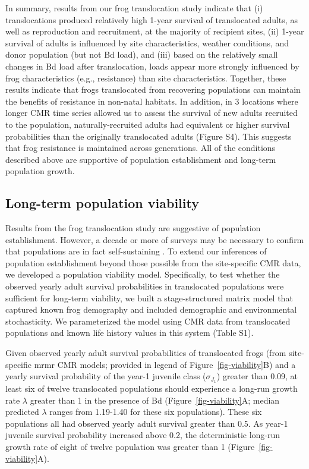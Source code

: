 \documentclass[9pt,twocolumn,twoside,lineno]{pnas-new}
\begin{document}
In summary, results from our frog translocation study indicate that (i)
translocations produced relatively high 1-year survival of translocated
adults, as well as reproduction and recruitment, at the majority of
recipient sites, (ii) 1-year survival of adults is influenced by site
characteristics, weather conditions, and donor population (but not Bd
load), and (iii) based on the relatively small changes in Bd load after
translocation, loads appear more strongly influenced by frog
characteristics (e.g., resistance) than site characteristics. Together,
these results indicate that frogs translocated from recovering
populations can maintain the benefits of resistance in non-natal
habitats. In addition, in 3 locations where longer CMR time series
allowed us to assess the survival of new adults recruited to the
population, naturally-recruited adults had equivalent or higher survival
probabilities than the originally translocated adults
(Figure S4). This suggests that frog
resistance is maintained across generations. All of the conditions
described above are supportive of population establishment and long-term
population growth.

\subsection*{Long-term population viability}

Results from the frog translocation study are suggestive of population
establishment. However, a decade or more of surveys may be necessary to
confirm that populations are in fact self-sustaining \citep{joseph2018}.
To extend our inferences of population establishment beyond those
possible from the site-specific CMR data, we developed a population
viability model. Specifically, to test whether the observed yearly adult
survival probabilities in translocated populations were sufficient for
long-term viability, we built a stage-structured matrix model that
captured known frog demography and included demographic and
environmental stochasticity. We parameterized the model using CMR data
from translocated populations and known life history values in this
system (Table S1).

Given observed yearly adult survival probabilities of translocated frogs
(from site-specific mrmr CMR models; provided in legend of
Figure~\ref{fig-viability}B) and a yearly survival probability of the
year-1 juvenile class (\(\sigma_{J_1}\)) greater than 0.09, at least six
of twelve translocated populations should experience a long-run growth
rate \(\lambda\) greater than 1 in the presence of Bd
(Figure~\ref{fig-viability}A; median predicted \(\lambda\) ranges from
1.19-1.40 for these six populations). These six populations all had
observed yearly adult survival greater than 0.5. As year-1 juvenile
survival probability increased above 0.2, the deterministic long-run
growth rate of eight of twelve population was greater than 1
(Figure~\ref{fig-viability}A).
\end{document}
